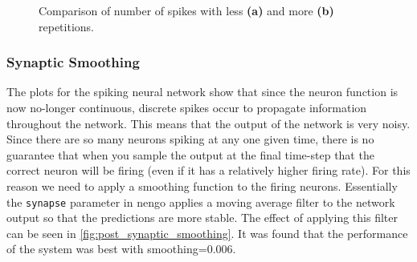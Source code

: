 \begin{figure}[htb]%
    \centering
    \caption{Comparison of number of spikes with less \textbf{(a)} and more \textbf{(b)} repetitions.}%
    \label{fig:frame_repititions}%
\end{figure}

\subsubsection{Synaptic Smoothing}

The plots for the spiking neural network show that since the neuron function is now no-longer continuous, discrete spikes occur to propagate information throughout the network. This means that the output of the network is very noisy. Since there are so many neurons spiking at any one given time, there is no guarantee that when you sample the output at the final time-step that the correct neuron will be firing (even if it has a relatively higher firing rate). For this reason we need to apply a smoothing function to the firing neurons. Essentially the \lstinline{synapse} parameter in nengo applies a moving average filter to the network output so that the predictions are more stable. The effect of applying this filter can be seen in \cref{fig:post_synaptic_smoothing}. It was found that the performance of the system was best with smoothing=0.006.

